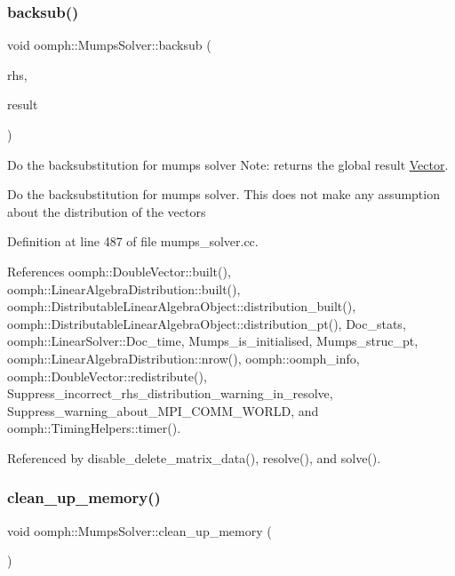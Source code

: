 \subsubsection{\texorpdfstring{backsub()}{backsub()}}
{\footnotesize\ttfamily void oomph\+::\+Mumps\+Solver\+::backsub (\begin{DoxyParamCaption}\item[{const \hyperlink{classoomph_1_1DoubleVector}{Double\+Vector} \&}]{rhs,  }\item[{\hyperlink{classoomph_1_1DoubleVector}{Double\+Vector} \&}]{result }\end{DoxyParamCaption})}



Do the backsubstitution for mumps solver Note\+: returns the global result \hyperlink{classoomph_1_1Vector}{Vector}. 

Do the backsubstitution for mumps solver. This does not make any assumption about the distribution of the vectors 

Definition at line 487 of file mumps\+\_\+solver.\+cc.



References oomph\+::\+Double\+Vector\+::built(), oomph\+::\+Linear\+Algebra\+Distribution\+::built(), oomph\+::\+Distributable\+Linear\+Algebra\+Object\+::distribution\+\_\+built(), oomph\+::\+Distributable\+Linear\+Algebra\+Object\+::distribution\+\_\+pt(), Doc\+\_\+stats, oomph\+::\+Linear\+Solver\+::\+Doc\+\_\+time, Mumps\+\_\+is\+\_\+initialised, Mumps\+\_\+struc\+\_\+pt, oomph\+::\+Linear\+Algebra\+Distribution\+::nrow(), oomph\+::oomph\+\_\+info, oomph\+::\+Double\+Vector\+::redistribute(), Suppress\+\_\+incorrect\+\_\+rhs\+\_\+distribution\+\_\+warning\+\_\+in\+\_\+resolve, Suppress\+\_\+warning\+\_\+about\+\_\+\+M\+P\+I\+\_\+\+C\+O\+M\+M\+\_\+\+W\+O\+R\+LD, and oomph\+::\+Timing\+Helpers\+::timer().



Referenced by disable\+\_\+delete\+\_\+matrix\+\_\+data(), resolve(), and solve().

\mbox{\label{classoomph_1_1MumpsSolver_adc1541e4a9cbbe9c641f988380618713}} 
\subsubsection{\texorpdfstring{clean\+\_\+up\+\_\+memory()}{clean\_up\_memory()}}
{\footnotesize\ttfamily void oomph\+::\+Mumps\+Solver\+::clean\+\_\+up\+\_\+memory (\begin{DoxyParamCaption}{ }\end{DoxyParamCaption})\hspace{0.3cm}{\ttfamily [virtual]}}



